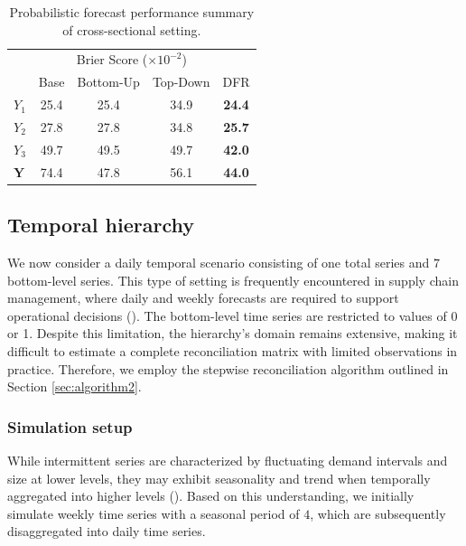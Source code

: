 \documentclass[a4paper,review,12pt,authoryear]{elsarticle}
\newcommand{\bY}{\mathbf{Y}}
\begin{document}
    
    \begin{table}
      \centering
      \caption{\label{tab:sim_crosssectional_res_dist} Probabilistic forecast performance summary of cross-sectional setting.}
      \begin{tabular}{lcccc}
      \toprule
      \multicolumn{5}{c}{Brier Score ($\times 10^{-2}$)}\\ 
      & Base & Bottom-Up & Top-Down & DFR \\\midrule
      $Y_1$ & 25.4 & 25.4 & 34.9 & \textbf{24.4} \\
      $Y_2$ & 27.8 & 27.8 & 34.8 & \textbf{25.7}\\
      $Y_3$ & 49.7 & 49.5 & 49.7 & \textbf{42.0} \\
      $\bY$ & 74.4 & 47.8 & 56.1 & \textbf{44.0} \\
      \bottomrule
      \end{tabular} 
    \end{table}
     
     
     \subsection{Temporal hierarchy}

     We now consider a daily temporal scenario consisting of one total series and $7$ bottom-level series. 
     This type of setting is frequently encountered in supply chain management, where daily and weekly forecasts are required to support operational decisions (\citealp{syntetosSupplyChainForecasting2016}).
     The bottom-level time series are restricted to values of 0 or 1.
     Despite this limitation, the hierarchy's domain remains extensive, making it difficult to estimate a complete reconciliation matrix with limited observations in practice. 
     Therefore, we employ the stepwise reconciliation algorithm outlined in Section \ref{sec:algorithm2}. 
     
     \subsubsection{Simulation setup}
     
     While intermittent series are characterized by fluctuating demand intervals and size at lower levels, they may exhibit seasonality and trend when temporally aggregated into higher levels ().
     Based on this understanding, we initially simulate weekly time series with a seasonal period of $4$, which are subsequently disaggregated into daily time series.
     
\end{document}

